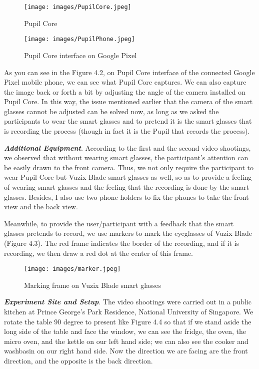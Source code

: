 \documentclass[fyp]{socreport}
\begin{document}
\begin{figure}[H]
\caption{Pupil Core}
\centering
\texttt{[image: images/PupilCore.jpeg]}
\end{figure}

\begin{figure}[H]
\caption{Pupil Core interface on Google Pixel}
\centering
\texttt{[image: images/PupilPhone.jpeg]}
\end{figure}

As you can see in the Figure 4.2, on Pupil Core interface of the connected Google Pixel mobile phone, we can see what Pupil Core captures. We can also capture the image back or forth a bit by adjusting the angle of the camera installed on Pupil Core. In this way, the issue mentioned earlier that the camera of the smart glasses cannot be adjusted can be solved now, as long as we asked the participants to wear the smart glasses and to pretend it is the smart glasses that is recording the process (though in fact it is the Pupil that records the process).

\textbf{\textit{Additional Equipment}}. According to the first and the second video shootings, we observed that without wearing smart glasses, the participant's attention can be easily drawn to the front camera. Thus, we not only require the participant to wear Pupil Core but Vuzix Blade smart glasses as well, so as to provide a feeling of wearing smart glasses and the feeling that the recording is done by the smart glasses. Besides, I also use two phone holders to fix the phones to take the front view and the back view. 

Meanwhile, to provide the user/participant with a feedback that the smart glasses  pretends to record, we use markers to mark the eyeglasses of Vuzix Blade (Figure 4.3). The red frame indicates the border of the recording, and if it is recording, we then draw a red dot at the center of this frame.

\begin{figure}[H]
\caption{Marking frame on Vuzix Blade smart glasses}
\centering
\texttt{[image: images/marker.jpeg]}
\end{figure}

\textbf{\textit{Experiment Site and Setup}}. The video shootings were carried out in a public kitchen at Prince George's Park Residence, National University of Singapore. We rotate the table 90 degree to present like Figure 4.4 so that if we stand aside the long side of the table and face the window, we can see the fridge, the oven, the micro oven, and the kettle on our left hand side; we can also see the cooker and washbasin on our right hand side. Now the direction we are facing are the front direction, and the opposite is the back direction. 
\end{document}
